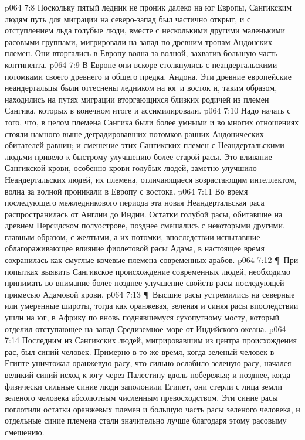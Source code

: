 \vs p064 7:8 Поскольку пятый ледник не проник далеко на юг Европы, Сангикским людям путь для миграции на северо\hyp{}запад был частично открыт, и с отступлением льда голубые люди, вместе с несколькими другими маленькими расовыми группами, мигрировали на запад по древним тропам Андонских племен. Они вторгались в Европу волна за волной, захватив большую часть континента.
\vs p064 7:9 В Европе они вскоре столкнулись с неандертальскими потомками своего древнего и общего предка, Андона. Эти древние европейские неандертальцы были оттеснены ледником на юг и восток и, таким образом, находились на путях миграции вторгающихся близких родичей из племен Сангика, которых в конечном итоге и ассимилировали.
\vs p064 7:10 Надо начать с того, что, в целом племена Сангика были более умными и во многих отношениях стояли намного выше деградировавших потомков ранних Андонических обитателей равнин; и смешение этих Сангикских племен с Неандертальскими людьми привело к быстрому улучшению более старой расы. Это вливание Сангикской крови, особенно крови голубых людей, заметно улучшило Неандертальских людей, их племена, отличающиеся возрастающим интеллектом, волна за волной проникали в Европу с востока.
\vs p064 7:11 Во время последующего межледникового периода эта новая Неандертальская раса распространилась от Англии до Индии. Остатки голубой расы, обитавшие на древнем Персидском полуострове, позднее смешались с некоторыми другими, главным образом, с желтыми, а их потомки, впоследствии испытавшие облагораживающее влияние фиолетовой расы Адама, в настоящее время сохранилась как смуглые кочевые племена современных арабов.
\vs p064 7:12 \P\ При попытках выявить Сангикское происхождение современных людей, необходимо принимать во внимание более позднее улучшение свойств расы последующей примесью Адамовой крови.
\vs p064 7:13 \P\ Высшие расы устремились на северные или умеренные широты, тогда как оранжевая, зеленая и синяя расы впоследствии ушли на юг, в Африку по вновь поднявшемуся сухопутному мосту, который отделил отступающее на запад Средиземное море от Индийского океана.
\vs p064 7:14 Последним из Сангикских людей, мигрировавшим из центра происхождения рас, был синий человек. Примерно в то же время, когда зеленый человек в Египте уничтожал оранжевую расу, что сильно ослабило зеленую расу, начался великий синий исход к югу через Палестину вдоль побережья; и позднее, когда физически сильные синие люди заполонили Египет, они стерли с лица земли зеленого человека абсолютным численным превосходством. Эти синие расы поглотили остатки оранжевых племен и большую часть расы зеленого человека, и отдельные синие племена стали значительно лучше благодаря этому расовыму смешению.

